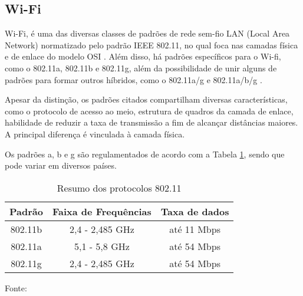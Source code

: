 





\subsection{Wi-Fi}
Wi-Fi, é uma das diversas classes de padrões de rede sem-fio LAN (Local Area Network) normatizado pelo padrão IEEE 802.11, no qual foca nas camadas física e de enlace do modelo OSI \cite{Gast2005}. 
Além disso, há padrões específicos para o Wi-fi, como o 802.11a, 802.11b e 802.11g,  além da possibilidade de unir alguns de padrões para formar outros híbridos, como o 802.11a/g e 802.11a/b/g \cite{Kurose2012}. 

Apesar da distinção, os padrões citados compartilham diversas características, como o protocolo de acesso ao meio, estrutura de quadros da camada de enlace, habilidade de reduzir a taxa de transmissão a fim de alcançar distâncias maiores. A principal diferença é vinculada à camada física.

Os padrões a, b e g são regulamentados de acordo com a Tabela \ref{tab:ieee80211abg-phy}, sendo que pode variar em diversos países.

\begin{table}[hbt]
    \caption{Resumo dos protocolos 802.11}
    \label{tab:ieee80211abg-phy}
    \centering
    \begin{tabular}{@{}ccc@{}}
        \toprule
        \textbf{Padrão} & \textbf{Faixa de Frequências} & \textbf{Taxa de dados} \\ \midrule
        802.11b         & 2,4 - 2,485 GHz               & até 11 Mbps            \\
        802.11a         & 5,1 - 5,8 GHz                 & até 54 Mbps            \\
        802.11g         & 2,4 - 2,485 GHz               & até 54 Mbps            \\ \bottomrule 
        \end{tabular}
        
    Fonte: \cite{Kurose2012}
\end{table}



